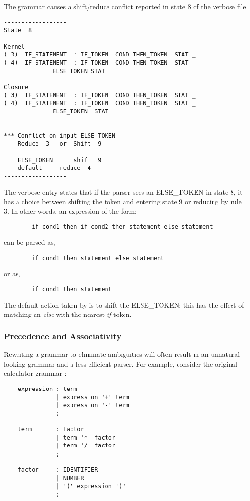 The grammar causes a shift/reduce conflict reported in state
8 of the verbose file

\begin{verbatim}
------------------
State  8

Kernel
( 3)  IF_STATEMENT	: IF_TOKEN  COND THEN_TOKEN  STAT _
( 4)  IF_STATEMENT	: IF_TOKEN  COND THEN_TOKEN  STAT _
			  ELSE_TOKEN STAT

Closure
( 3)  IF_STATEMENT	: IF_TOKEN  COND THEN_TOKEN  STAT _
( 4)  IF_STATEMENT	: IF_TOKEN  COND THEN_TOKEN  STAT _
			  ELSE_TOKEN  STAT


*** Conflict on input ELSE_TOKEN
	Reduce  3	or	Shift  9

 	ELSE_TOKEN  	shift  9
 	default 	reduce  4
------------------
\end{verbatim}

The verbose entry states that if the parser sees an ELSE\_TOKEN in state 8,
it has a choice between shifting the token and entering state 9 or reducing
by rule 3.  In other words, an expression of the form:

\begin{verbatim}
        if cond1 then if cond2 then statement else statement

\end{verbatim}
can be parsed as,
\begin{verbatim}
        if cond1 then statement else statement
\end{verbatim}
or as,
\begin{verbatim}
        if cond1 then statement

\end{verbatim}

The default action taken by \ayacc is to shift the ELSE\_TOKEN;
this has the effect of matching an {\it else} with the nearest {\it if}
token.
\subsubsection{Precedence and Associativity}
Rewriting a grammar to eliminate ambiguities will often result
in an unnatural looking grammar and a less efficient parser.  For example,
consider the original calculator grammar :
\begin{verbatim}
    expression : term
               | expression '+' term
               | expression '-' term
               ;

    term       : factor
               | term '*' factor
               | term '/' factor
               ;

    factor     : IDENTIFIER
               | NUMBER
               | '(' expression ')'
               ;

\end{verbatim}

